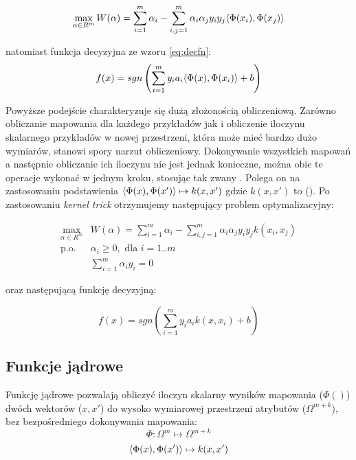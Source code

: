 \begin{equation}
\max\limits_{\alpha \in R^m}  W(\alpha) = \sum_{i=1}^{m} \alpha_i - \sum_{i,j=1}^{m} \alpha_i \alpha_j y_i y_j \langle \Phi(x_i), \Phi(x_j) \rangle
\label{eq:dual-k-target}
\end{equation}

natomiast funkcja decyzyjna ze wzoru \ref{eq:decfn}:
\begin{equation}
f(x) = sgn \left( \sum_{i=1}^{m} y_i a_i \langle \Phi(x), \Phi(x_i) \rangle + b \right)
\end{equation}

\FloatBarrier

Powyższe podejście charakteryzuje się dużą złożonością obliczeniową. Zarówno obliczanie mapowania dla każdego przykładów jak i obliczenie iloczynu skalarnego przykładów w nowej przestrzeni, która może mieć bardzo dużo wymiarów, stanowi spory narzut obliczeniowy. Dokonywanie wszystkich mapowań a następnie obliczanie ich iloczynu nie jest jednak konieczne, można obie te operacje wykonać w jednym kroku, stosując tak zwany  \cite{Boser:1992:TAO:130385.130401}. Polega on na zastosowaniu podstawienia $ \langle \Phi(x), \Phi(x') \rangle \mapsto k(x, x') $ gdzie $ k(x,x') $ to  (). Po zastosowaniu \emph{kernel trick} otrzymujemy następujący problem optymalizacyjny:

\begin{equation}
\begin{array}{ll}
\max\limits_{\alpha \in R^m} & W(\alpha) = \sum_{i=1}^{m} \alpha_i - \sum_{i,j=1}^{m} \alpha_i \alpha_j y_i y_j k(x_i, x_j) \\
\text{p.o.} &  \alpha_i \geq 0 , \text{ dla } i=1..m \\
& \sum_{i=1}^{m} \alpha_i y_i = 0
\end{array}
\label{eq:dual-k}
\end{equation}

oraz następującą funkcję decyzyjną: 

\begin{equation}
f(x) = sgn \left( \sum_{i=1}^{m} y_i a_i k(x, x_i) + b \right)
\label{eq:decfn-k}
\end{equation}

\subsection{Funkcje jądrowe}

Funkcję jądrowe pozwalają obliczyć iloczyn skalarny wyników mapowania ($ \Phi() $) dwóch wektorów ($ x, x' $) do wysoko wymiarowej przestrzeni atrybutów ($ \Omega^{m+k} $), bez bezpośredniego dokonywania mapowania:
$$ \Phi: \Omega^m \mapsto \Omega^{m+k} $$
$$ \langle \Phi(x), \Phi(x') \rangle \mapsto k(x, x')  $$

